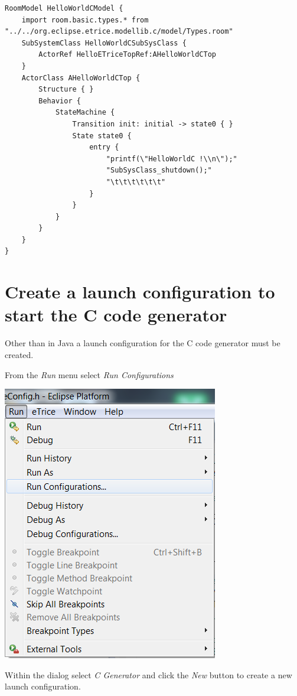 \begin{verbatim} 
RoomModel HelloWorldCModel {
	import room.basic.types.* from "../../org.eclipse.etrice.modellib.c/model/Types.room"
	SubSystemClass HelloWorldCSubSysClass {
		ActorRef HelloETriceTopRef:AHelloWorldCTop 
	}
	ActorClass AHelloWorldCTop {
		Structure { }
		Behavior {
			StateMachine {
				Transition init: initial -> state0 { }
				State state0 {
					entry {
						"printf(\"HelloWorldC !\\n\");"
						"SubSysClass_shutdown();"
						"\t\t\t\t\t\t"
					}
				}
			}
		}
	}	
}
\end{verbatim}

\section{Create a launch configuration to start the C code generator}

Other than in Java a launch configuration for the C code generator must be created.

From the \textit{Run} menu select \textit{Run Configurations}

\includegraphics{images/034-HelloWorldC06.png}

Within the dialog select \textit{\eTrice{} C Generator} and click the \textit{New} button to create a new 
launch configuration.


